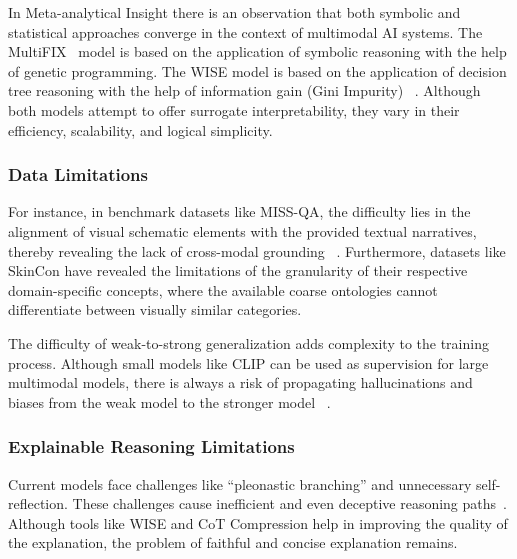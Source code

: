 \documentclass[sigconf, nonacm]{acmart}
\begin{document}
In Meta-analytical Insight there is an observation that both symbolic and 
statistical approaches converge in the context of multimodal AI systems. 
The MultiFIX~\cite{malafaia2025step} model is based on the application of symbolic reasoning with 
the help of genetic programming. The WISE model is based on the application 
of decision tree reasoning with the help of information gain (Gini Impurity)~%
\cite{jiang2025wise}. Although both models attempt to offer surrogate 
interpretability, they vary in their efficiency, scalability, and logical 
simplicity.

\subsubsection{Data Limitations}
For instance, in benchmark datasets like MISS-QA, the difficulty lies in 
the alignment of visual schematic elements with the provided textual 
narratives, thereby revealing the lack of cross-modal grounding~%
\cite{zhao2025missqa}. Furthermore, datasets like SkinCon have revealed the 
limitations of the granularity of their respective domain-specific concepts, 
where the available coarse ontologies cannot differentiate between visually 
similar categories.

The difficulty of weak-to-strong generalization adds complexity to the 
training process. Although small models like CLIP can be used as supervision 
for large multimodal models, there is always a risk of propagating 
hallucinations and biases from the weak model to the stronger model~%
\cite{jiang2025wise}.

\subsubsection{Explainable Reasoning Limitations}
Current models face challenges like ``pleonastic branching'' and unnecessary 
self-reflection. These challenges cause inefficient and even deceptive 
reasoning paths~\cite{wang2026bridging, jiang2025wise}. Although tools like 
WISE and CoT Compression help in improving the quality of the explanation, 
the problem of faithful and concise explanation remains.
\end{document}
